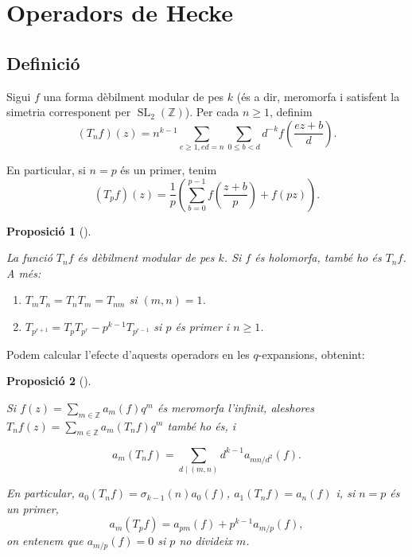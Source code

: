 \documentclass[
  letterpaper,
  DIV=11,
  numbers=noendperiod]{scrreprt}
\providecommand{\tightlist}{%
  \setlength{\itemsep}{0pt}\setlength{\parskip}{0pt}}\usepackage{longtable,booktabs,array}
\theoremstyle{plain}
\theoremstyle{plain}
\theoremstyle{definition}
\theoremstyle{plain}
\newtheorem{proposition}{Proposició}[chapter]
\theoremstyle{plain}
\theoremstyle{definition}
\theoremstyle{remark}
\begin{document}
\providecommand{\slz}{\operatorname{SL}_2(\bZ)}
\providecommand{\to}{\longrightarrow}
\providecommand{\dlog}{\operatorname{dlog}}

\providecommand{\slsh}[1]{|_{#1}}

\section{Operadors de Hecke}\label{operadors-de-hecke}

\subsection{Definició}\label{definiciuxf3}

Sigui \(f\) una forma dèbilment modular de pes \(k\) (és a dir,
meromorfa i satisfent la simetria corresponent per
\(\operatorname{SL}_2(\mathbb{Z})\)). Per cada \(n\geq 1\), definim \[
(T_nf)(z) = n^{k-1} \sum_{e\geq 1, ed=n}\sum_{0\leq b < d} d^{-k} f\left(\frac{ez+b}{d}\right).
\]

En particular, si \(n=p\) és un primer, tenim \[
(T_pf)(z) = \frac{1}{p} \left(\sum_{b=0}^{p-1} f(\frac{z+b}{p}) + f(pz)\right).
\]

\begin{proposition}[]\protect\hypertarget{prp-}{}\label{prp-}

La funció \(T_nf\) és dèbilment modular de pes \(k\). Si \(f\) és
holomorfa, també ho és \(T_nf\). A més:

\begin{enumerate}
\def\labelenumi{\arabic{enumi}.}
\tightlist
\item
  \(T_m T_n = T_n T_m = T_{nm}\) si \((m,n)=1\).
\item
  \(T_{p^{r+1}} = T_p T_{p^r} - p^{k-1} T_{p^{r-1}}\) si \(p\) és primer
  i \(n\geq 1\).
\end{enumerate}

\end{proposition}

Podem calcular l'efecte d'aquests operadors en les \(q\)-expansions,
obtenint:

\begin{proposition}[]\protect\hypertarget{prp-}{}\label{prp-}

Si \(f(z)=\sum_{m\in \mathbb{Z}} a_m(f)q^m\) és meromorfa l'infinit,
aleshores \(T_nf(z)=\sum_{m\in\mathbb{Z}} a_m(T_nf)q^m\) també ho és, i

\[
a_m(T_nf) = \sum_{d \mid (m,n)} d^{k-1} a_{mn/d^2}(f).
\]

En particular, \(a_0(T_nf) = \sigma_{k-1}(n) a_0(f)\),
\(a_1(T_nf) = a_n(f)\) i, si \(n=p\) és un primer, \[
a_m(T_pf) = a_{pm}(f) + p^{k-1} a_{m/p}(f),
\] on entenem que \(a_{m/p}(f)=0\) si \(p\) no divideix \(m\).

\end{proposition}
\end{document}
